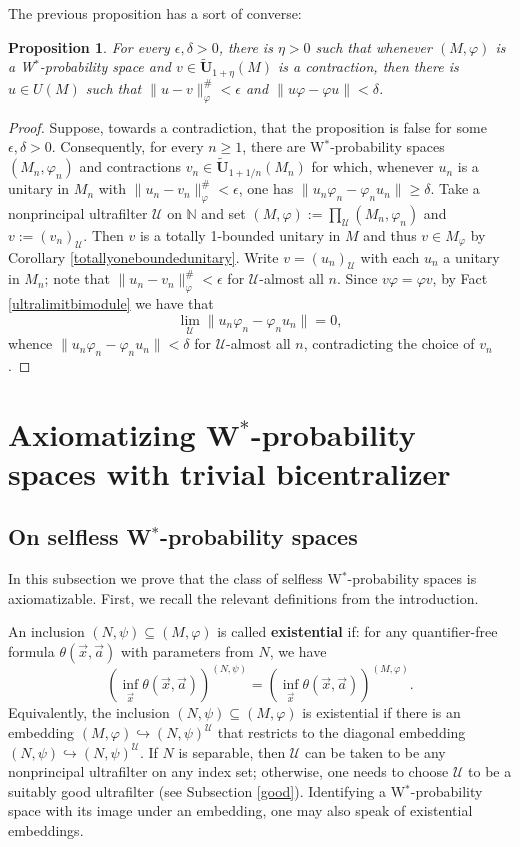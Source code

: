 \documentclass[12pt]{amsart}
\newtheorem{prop}[thm]{Proposition}
\theoremstyle{definition}
\def\bb{\mathbb}
\def\bb{\mathbb}
\def\u{\mathsf 1}
\def \u{\mathcal U}
\begin{document}
The previous proposition has a sort of converse:

\begin{prop}\label{almmostunitaryalmostcentralizing}
For every $\epsilon,\delta>0$, there is $\eta>0$ such that whenever $(M,\varphi)$ is a W$^*$-probability space and $v\in \tilde{\mathbf{U}}_{1+\eta}(M)$ is a contraction, then there is $u\in U(M)$ such that $\|u-v\|_\varphi^\#<\epsilon$ and $\|u\varphi-\varphi u\|<\delta$.
\end{prop}

\begin{proof}
Suppose, towards a contradiction, that the proposition is false for some $\epsilon,\delta>0$.  Consequently, for every $n\geq 1$, there are W$^*$-probability spaces $(M_n,\varphi_n)$ and contractions $v_n\in \tilde{\mathbf{U}}_{1+1/n}(M_n)$ for which, whenever $u_n$ is a unitary in $M_n$ with $\|u_n-v_n\|_\varphi^\#<\epsilon$, one has $\|u_n\varphi_n-\varphi_n u_n\|\geq \delta$.  Take a nonprincipal ultrafilter $\u$ on $\bb N$ and set $(M,\varphi):=\prod_\u (M_n,\varphi_n)$ and $v:=(v_n)_\u$.  Then $v$ is a totally 1-bounded unitary in $M$ and thus $v\in M_\varphi$ by Corollary \ref{totallyoneboundedunitary}.  Write $v=(u_n)_\u$ with each $u_n$ a unitary in $M_n$; note that $\|u_n-v_n\|_\varphi^\#<\epsilon$ for $\u$-almost all $n$.  Since $v\varphi=\varphi v$, by Fact \ref{ultralimitbimodule} we have that $$\lim_\u \|u_n\varphi_n-\varphi_n u_n\|=0,$$ whence $\|u_n\varphi_n-\varphi_n u_n\|<\delta$ for $\u$-almost all $n$, contradicting the choice of $v_n$.
\end{proof}


\section{Axiomatizing W$^*$-probability spaces with trivial bicentralizer}\label{sec axiomatize TBC}

\subsection{On selfless W$^*$-probability spaces}

In this subsection we prove that the class of selfless W$^*$-probability spaces is axiomatizable.  First, we recall the relevant definitions from the introduction.

An inclusion $(N,\psi)\subseteq (M,\varphi)$ is called \textbf{existential} if:  for any quantifier-free formula $\theta(\vec x,\vec a)$ with parameters from $N$, we have
$$\left(\inf_{\vec x}\theta(\vec x,\vec a)\right)^{(N,\psi)}=\left(\inf_{\vec x} \theta(\vec x,\vec a)\right)^{(M,\varphi)}.$$
Equivalently, the inclusion $(N,\psi)\subseteq (M,\varphi)$ is existential if there is an embedding $(M,\varphi)\hookrightarrow (N,\psi)^\u$ that restricts to the diagonal embedding $(N,\psi)\hookrightarrow (N,\psi)^\u$.  If $N$ is separable, then $\u$ can be taken to be any nonprincipal ultrafilter on any index set; otherwise, one needs to choose $\u$ to be a suitably good ultrafilter (see Subsection \ref{good}).  Identifying a W$^*$-probability space with its image under an embedding, one may also speak of existential embeddings.  
\end{document}
